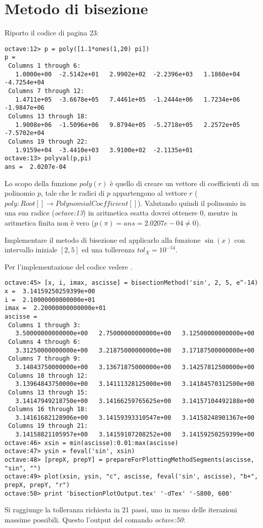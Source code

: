 \section{Metodo di bisezione}
\label{sec:metodoDiBisezione}
Riporto il codice di pagina 23:
\begin{lstlisting}
octave:12> p = poly([1.1*ones(1,20) pi])
p =
 Columns 1 through 6:
   1.0000e+00  -2.5142e+01   2.9902e+02  -2.2396e+03   1.1860e+04  -4.7254e+04
 Columns 7 through 12:
   1.4711e+05  -3.6678e+05   7.4461e+05  -1.2444e+06   1.7234e+06  -1.9847e+06
 Columns 13 through 18:
   1.9008e+06  -1.5096e+06   9.8794e+05  -5.2718e+05   2.2572e+05  -7.5702e+04
 Columns 19 through 22:
   1.9159e+04  -3.4410e+03   3.9100e+02  -2.1135e+01
octave:13> polyval(p,pi)
ans =  2.0207e-04
\end{lstlisting}
Lo scopo della funzione $poly(r)$ \`e quello di creare un vettore di coefficienti
di un polinomio $p$, tale che le radici di $p$ appartengono al vettore $r$ 
($poly: Root[] \rightarrow PolynomialCoefficient[]$).
Valutando quindi il polinomio in una sua radice (\emph{octave:13}) in aritmetica
esatta dovrei ottenere 0, mentre in aritmetica finita non \`e vero 
($p(\pi) = ans =  2.0207e-04 \not = 0$).

\begin{exercise}
Implementare il metodo di bisezione ed applicarlo alla funzione $\sin(x)$ 
con intervallo iniziale $[2, 5]$ ed una tollerenza $tol_{X} = 10^{-14}$.
\end{exercise}
Per l'implementazione del codice vedere .
\begin{lstlisting}
octave:45> [x, i, imax, ascisse] = bisectionMethod('sin', 2, 5, e^-14)
x =  3.14159250259399e+00
i =  2.10000000000000e+01
imax =  2.20000000000000e+01
ascisse =
 Columns 1 through 3:
   3.50000000000000e+00   2.75000000000000e+00   3.12500000000000e+00
 Columns 4 through 6:
   3.31250000000000e+00   3.21875000000000e+00   3.17187500000000e+00
 Columns 7 through 9:
   3.14843750000000e+00   3.13671875000000e+00   3.14257812500000e+00
 Columns 10 through 12:
   3.13964843750000e+00   3.14111328125000e+00   3.14184570312500e+00
 Columns 13 through 15:
   3.14147949218750e+00   3.14166259765625e+00   3.14157104492188e+00
 Columns 16 through 18:
   3.14161682128906e+00   3.14159393310547e+00   3.14158248901367e+00
 Columns 19 through 21:
   3.14158821105957e+00   3.14159107208252e+00   3.14159250259399e+00
octave:46> xsin = min(ascisse):0.01:max(ascisse)
octave:47> ysin = feval('sin', xsin)
octave:48> [prepX, prepY] = prepareForPlottingMethodSegments(ascisse, "sin", "")
octave:49> plot(xsin, ysin, "c", ascisse, feval('sin', ascisse), "b+", prepX, prepY, "r")
octave:50> print 'bisectionPlotOutput.tex' '-dTex' '-S800, 600'
\end{lstlisting}
Si raggiunge la tolleranza richiesta in 21 passi, uno in meno delle iterazioni
massime possibili. Questo l'output del comando \emph{octave:50}:
\begin{center}

\end{center}

